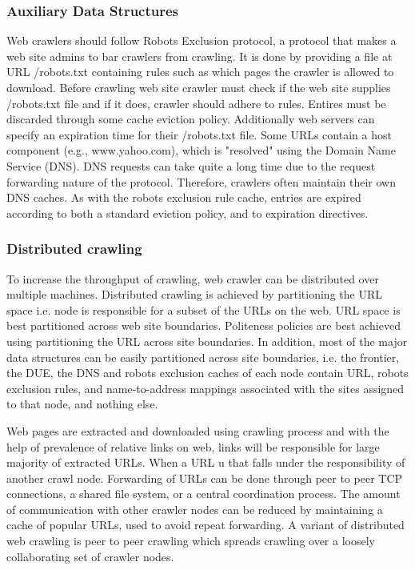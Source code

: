\documentclass[article,type=msc,colorback,accentcolor=tud9c,twoside,11pt]{tudthesis}
\begin{document}
\subsubsection{Auxiliary Data Structures}
Web crawlers should follow Robots Exclusion protocol, a protocol that makes a web site admins to bar crawlers from crawling. It is done by providing a file at URL /robots.txt containing rules such as which pages the crawler is allowed to download. Before crawling web site crawler must check if the web site supplies /robots.txt file and if it does, crawler should adhere to rules. Entires must be discarded through some cache eviction policy. Additionally web servers can specify an expiration time for their /robots.txt file. Some URLs contain a host component (e.g., www.yahoo.com), which is "resolved" using the Domain Name Service (DNS). DNS requests can take quite a long time due to the request forwarding nature of the protocol. Therefore, crawlers often maintain their own DNS caches. As with the robots exclusion rule cache, entries are expired according to both a standard eviction policy, and to expiration directives.
 
\subsubsection{Distributed crawling}

To increase the throughput of crawling, web crawler can be distributed over multiple machines. Distributed crawling is achieved by partitioning the URL space i.e. node is responsible for a subset of the URLs on the web. URL space is best partitioned across web site boundaries. Politeness policies are best achieved using partitioning the URL across site boundaries. In addition, most of the major data structures can be easily partitioned across site boundaries, i.e. the frontier, the DUE, the DNS and robots exclusion caches of each node contain URL, robots exclusion rules, and name-to-address mappings associated with the sites assigned to that node, and nothing else.

Web pages are extracted and downloaded using crawling process and with the help of prevalence of relative links on web, links will be responsible for large majority of extracted URLs. When a URL u that falls under the responsibility of another crawl node. Forwarding of URLs can be done through peer to peer TCP connections\cite{Highperformancewebcrawling}, a shared file system\cite{Highperformance}, or a central coordination process\cite{anatomy}. The amount of communication with other crawler nodes can be reduced by maintaining a cache of popular URLs, used to avoid repeat forwarding\cite{Graphstructure}. A variant of distributed web crawling is peer to peer crawling which spreads crawling over a loosely collaborating set of crawler nodes.
\end{document}
